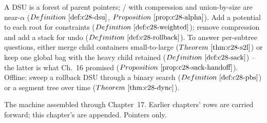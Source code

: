 \begin{recallbox}
A DSU is a forest of parent pointers; / with compression
and union-by-size are near-\(\alpha\) (\(\defref{c28-dsu}\),
\(\propref{c28-alpha}\)). Add a potential to each root for constraints
(\(\defref{c28-weighted}\)); remove compression and add a stack for undo
(\(\defref{c28-rollback}\)). To answer per-subtree questions, either merge child
containers small-to-large (\(\thmref{c28-s2l}\)) or keep one global bag with the
heavy child retained (\(\defref{c28-sack}\)) -- the latter is what Ch.~16
promised (\(\propref{c28-sack-handoff}\)). Offline: sweep a rollback DSU through
a binary search (\(\defref{c28-pbs}\)) or a segment tree over time
(\(\thmref{c28-dync}\)).
\end{recallbox}


The machine assembled through Chapter~17. Earlier chapters' rows are carried
forward; this chapter's are appended. Pointers only.

